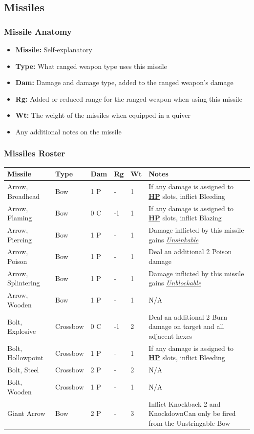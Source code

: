 \documentclass[12pt]{article}
\newcommand{\refto}[1]{\hyperlink{#1}{\textbf{#1}}}
\newcommand{\reftoit}[1]{\hyperlink{#1}{\emph{#1}}}
\begin{document}
\pagebreak

\subsection{Missiles}
\subsubsection*{Missile Anatomy}
\begin{itemize}
\item \textbf{Missile:} Self-explanatory
\item \textbf{Type:} What ranged weapon type uses this missile
\item \textbf{Dam:} Damage and damage type, added to the ranged weapon’s damage
\item \textbf{Rg:} Added or reduced range for the ranged weapon when using this missile
\item \textbf{Wt:} The weight of the missiles when equipped in a quiver
\item Any additional notes on the missile
\end{itemize}

\subsubsection*{Missiles Roster}
\begin{center}
\begin{tabularx}{\textwidth}{p{}p{}p{}p{}p{}p{}}
\hline
\rowcolor{white} \textbf{Missile} & \textbf{Type} & \textbf{Dam} & \textbf{Rg} & \textbf{Wt} & \textbf{Notes}\\
\hline
Arrow, Broadhead  & Bow & 1 P & - & 1 & If any damage is assigned to \refto{HP} slots, inflict Bleeding\\
Arrow, Flaming & Bow & 0 C & -1 & 1 & If any damage is assigned to \refto{HP} slots, inflict Blazing\\
Arrow, Piercing & Bow & 1 P & - & 1 & Damage inflicted by this missile gains \reftoit{Unsinkable}\\
Arrow, Poison & Bow & 1 P &  - & 1 & Deal an additional 2 Poison damage\\
Arrow, Splintering & Bow & 1 P & - & 1 & Damage inflicted by this missile gains \reftoit{Unblockable}\\
Arrow, Wooden & Bow & 1 P & - & 1 & N/A\\
Bolt, Explosive & Crossbow & 0 C & -1 & 2 & Deal an additional 2 Burn damage on target and all adjacent hexes\\
Bolt, Hollowpoint & Crossbow & 1 P &  - & 1 & If any damage is assigned to \refto{HP} slots, inflict Bleeding\\
Bolt, Steel & Crossbow & 2 P &  - & 2 & N/A\\
Bolt, Wooden & Crossbow & 1 P & - & 1 & N/A\\
Giant Arrow & Bow & 2 P &  - & 3 & Inflict Knockback 2 and Knockdown\newline Can only be fired from the Unstringable Bow\\
\hline
\end{tabularx}
\end{center}
\end{document}

